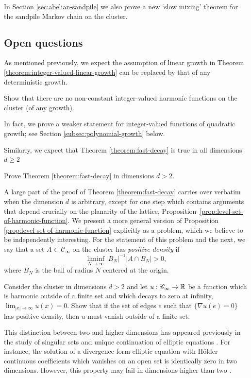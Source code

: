 \documentclass[12pt]{amsart}
\numberwithin{equation}{section}
\begin{document}
	In Section \ref{sec:abelian-sandpile} we also prove a new `slow mixing' theorem for the sandpile Markov chain on the cluster.
	\subsection{Open questions}
	As mentioned previously, we expect the assumption of linear growth in Theorem \ref{theorem:integer-valued-linear-growth} 
	can be replaced by that of any deterministic growth. 
	\begin{problem} \label{problem:all-growth}
		Show that there are no non-constant integer-valued harmonic functions on the cluster (of any growth).
	\end{problem}
	In fact, we prove a weaker statement for integer-valued functions of quadratic growth; see Section \ref{subsec:polynomial-growth} below. 
	
	Similarly, we expect that Theorem \ref{theorem:fast-decay} is true in all dimensions $d \geq 2$
	\begin{problem} \label{problem:all-dimensions}
		Prove Theorem \ref{theorem:fast-decay} in dimensions $d > 2$.
	\end{problem}
	A large part of the proof of Theorem \ref{theorem:fast-decay} carries over verbatim when the dimension $d$ is arbitrary, except for one step which contains arguments that depend crucially on the planarity of the lattice, Proposition~\ref{prop:level-set-of-harmonic-function}.  We present a more general version of Proposition~ \ref{prop:level-set-of-harmonic-function} explicitly as a problem, which we believe to be independently interesting. For the statement of this problem and the next, 
	we say that a set $A \subset \mathscr{C}_{\infty}$ on the cluster has {\it positive density} if 
	\begin{equation} \label{eq:has-density}
		\liminf_{N \to \infty} |B_N|^{-1}  |A \cap B_N| > 0,
	\end{equation}
	where $B_N$ is the ball of radius $N$ centered at the origin. 
	\begin{problem} \label{problem:level-set}
		Consider the cluster in dimensions $d > 2$ and let $u: \mathscr{C}_{\infty} \to \operatorname{\mathbb{R}}$ be a function which is harmonic outside of a finite set and which decays to zero at infinity, $\lim_{|x| \to \infty} u(x) = 0$.  Show that if the set of edges $e$ such that $\{ \nabla u(e) = 0\}$ has positive density, then $u$ must vanish outside  of a finite set. 
	\end{problem}
	This distinction between two and higher dimensions has appeared previously in the study of singular sets and unique continuation of elliptic equations \cite{logunov-malinnikova-survey, han-singular-sets}. For instance, the solution of a divergence-form elliptic equation with H\"older continuous coefficients which vanishes on an open set is identically zero 
	in two dimensions. However, this property may fail in dimensions higher than two \cite{miller-unique-continuation}. 
	
\end{document}
